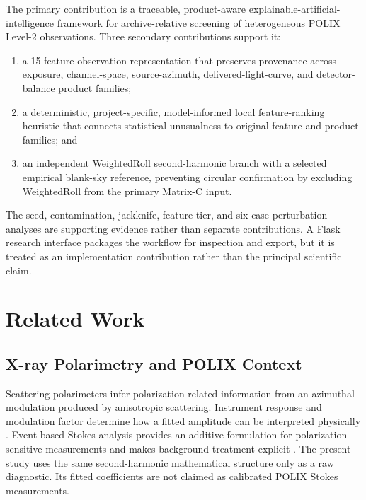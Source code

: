 \documentclass[conference]{IEEEtran}
\begin{document}
The primary contribution is a traceable, product-aware explainable-artificial-intelligence framework for archive-relative screening of heterogeneous POLIX Level-2 observations. Three secondary contributions support it:


\begin{enumerate}

\item a 15-feature observation representation that preserves provenance across exposure, channel-space, source-azimuth, delivered-light-curve, and detector-balance product families;

\item a deterministic, project-specific, model-informed local feature-ranking heuristic that connects statistical unusualness to original feature and product families; and

\item an independent WeightedRoll second-harmonic branch with a selected empirical blank-sky reference, preventing circular confirmation by excluding WeightedRoll from the primary Matrix-C input.

\end{enumerate}

The seed, contamination, jackknife, feature-tier, and six-case perturbation analyses are supporting evidence rather than separate contributions. A Flask research interface packages the workflow for inspection and export, but it is treated as an implementation contribution rather than the principal scientific claim.


\section{Related Work}

\subsection{X-ray Polarimetry and POLIX Context}

Scattering polarimeters infer polarization-related information from an azimuthal modulation produced by anisotropic scattering. Instrument response and modulation factor determine how a fitted amplitude can be interpreted physically \cite{fabiani2018instrumentation}. Event-based Stokes analysis provides an additive formulation for polarization-sensitive measurements and makes background treatment explicit \cite{kislat2015stokes}. The present study uses the same second-harmonic mathematical structure only as a raw diagnostic. Its fitted coefficients are not claimed as calibrated POLIX Stokes measurements.
\end{document}
